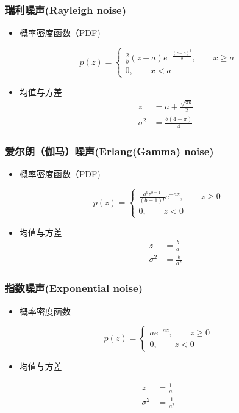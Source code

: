 \documentclass{beamer}
\begin{document}
\begin{frame}
\frametitle{瑞利噪声(Rayleigh noise)}
\label{sec-3-5}

\begin{itemize}
\item 概率密度函数（PDF)
\end{itemize}

\[
p(z)=
\begin{cases}
\frac{2}{b}(z-a)e^{-\frac{(z-a)^2}{b}},\qquad  x\geq a \\
0 ,\qquad x<a
\end{cases}
\]

\begin{itemize}
\item 均值与方差
   \begin{align*}
    \bar z &= a+\frac{\sqrt{\pi b}}{2} \\
    \sigma^2 &=  \frac{b(4-\pi)}{4}
   \end{align*}
\end{itemize}
\end{frame}
\begin{frame}
\frametitle{爱尔朗（伽马）噪声(Erlang(Gamma) noise)}
\label{sec-3-6}

\begin{itemize}
\item 概率密度函数（PDF)
\end{itemize}
\[
p(z) = 
\begin{cases}
\frac{a^bz^{b-1}}{(b-1)!}e^{-az}, \qquad  z\geq 0 \\
0 , \qquad z<0
\end{cases}
 \]

\begin{itemize}
\item 均值与方差
   \begin{align*}
    \bar z &= \frac{b}{a} \\
    \sigma^2 &=  \frac{b}{a^2}
   \end{align*}
\end{itemize}
\end{frame}
\begin{frame}
\frametitle{指数噪声(Exponential noise)}
\label{sec-3-7}

\begin{itemize}
\item 概率密度函数
\end{itemize}
\[ p(z) = 
\begin{cases}
a e^{-az}, \qquad z\geq 0 \\
0, \qquad z<0
\end{cases}
\]
\begin{itemize}
\item 均值与方差
\end{itemize}
\begin{align*}
    \bar z &= \frac{1}{a} \\
    \sigma^2 &=  \frac{1}{a^2}
\end{align*}
\end{frame}
\end{document}
